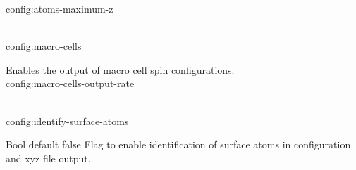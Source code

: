 {\zicf config:atoms-maximum-z}\\

{\zicf config:macro-cells} Enables the output of macro cell spin configurations.\\

{\zicf config:macro-cells-output-rate}\\

{\zicf  config:identify-surface-atoms}
  Bool default false
  Flag to enable identification of surface atoms in configuration and xyz  file output.\\


